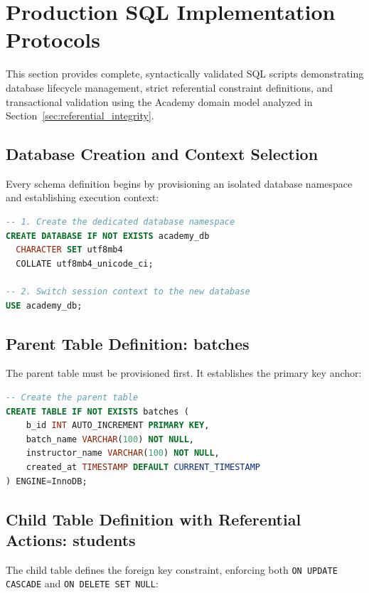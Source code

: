 \documentclass[10pt,journal,compsoc,onecolumn]{IEEEtran}
\begin{document}
\section{Production SQL Implementation Protocols}
\label{sec:sql_implementation}

This section provides complete, syntactically validated SQL scripts demonstrating database lifecycle management, strict referential constraint definitions, and transactional validation using the Academy domain model analyzed in Section~\ref{sec:referential_integrity}.

\subsection{Database Creation and Context Selection}
Every schema definition begins by provisioning an isolated database namespace and establishing execution context:

\begin{lstlisting}[language=SQL]
-- 1. Create the dedicated database namespace
CREATE DATABASE IF NOT EXISTS academy_db
  CHARACTER SET utf8mb4
  COLLATE utf8mb4_unicode_ci;

-- 2. Switch session context to the new database
USE academy_db;
\end{lstlisting}

\subsection{Parent Table Definition: batches}
The parent table must be provisioned first. It establishes the primary key anchor:

\begin{lstlisting}[language=SQL]
-- Create the parent table
CREATE TABLE IF NOT EXISTS batches (
    b_id INT AUTO_INCREMENT PRIMARY KEY,
    batch_name VARCHAR(100) NOT NULL,
    instructor_name VARCHAR(100) NOT NULL,
    created_at TIMESTAMP DEFAULT CURRENT_TIMESTAMP
) ENGINE=InnoDB;
\end{lstlisting}

\subsection{Child Table Definition with Referential Actions: students}
The child table defines the foreign key constraint, enforcing both \texttt{ON UPDATE CASCADE} and \texttt{ON DELETE SET NULL}:
\end{document}
